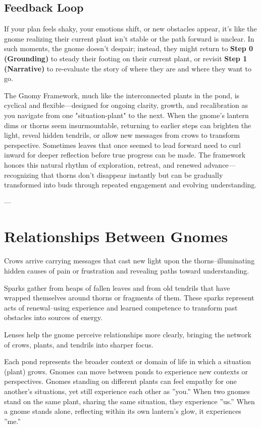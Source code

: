 \documentclass{article}
\begin{document}
\subsection{Feedback Loop}
If your plan feels shaky, your emotions shift, or new obstacles appear, it's like the gnome realizing their current plant isn't stable or the path forward is unclear. In such moments, the gnome doesn't despair; instead, they might return to \textbf{Step 0 (Grounding)} to steady their footing on their current plant, or revisit \textbf{Step 1 (Narrative)} to re-evaluate the story of where they are and where they want to go. 

The Gnomy Framework, much like the interconnected plants in the pond, is cyclical and flexible—designed for ongoing clarity, growth, and recalibration as you navigate from one "situation-plant" to the next. When the gnome's lantern dims or thorns seem insurmountable, returning to earlier steps can brighten the light, reveal hidden tendrils, or allow new messages from crows to transform perspective. Sometimes leaves that once seemed to lead forward need to curl inward for deeper reflection before true progress can be made. The framework honors this natural rhythm of exploration, retreat, and renewed advance—recognizing that thorns don't disappear instantly but can be gradually transformed into buds through repeated engagement and evolving understanding.

---

\section{Relationships Between Gnomes}

Crows arrive carrying messages that cast new light upon the thorns--illuminating hidden causes of pain or frustration and revealing paths toward understanding.

Sparks gather from heaps of fallen leaves and from old tendrils that have wrapped themselves around thorns or fragments of them. These sparks represent acts of renewal--using experience and learned competence to transform past obstacles into sources of energy.

Lenses help the gnome perceive relationships more clearly, bringing the network of crows, plants, and tendrils into sharper focus.

Each pond represents the broader context or domain of life in which a situation (plant) grows. Gnomes can move between ponds to experience new contexts or perspectives. Gnomes standing on different plants can feel empathy for one another’s situations, yet still experience each other as ''you.”
When two gnomes stand on the same plant, sharing the same situation, they experience ''us.”
When a gnome stands alone, reflecting within its own lantern’s glow, it experiences ''me.”
\end{document}
